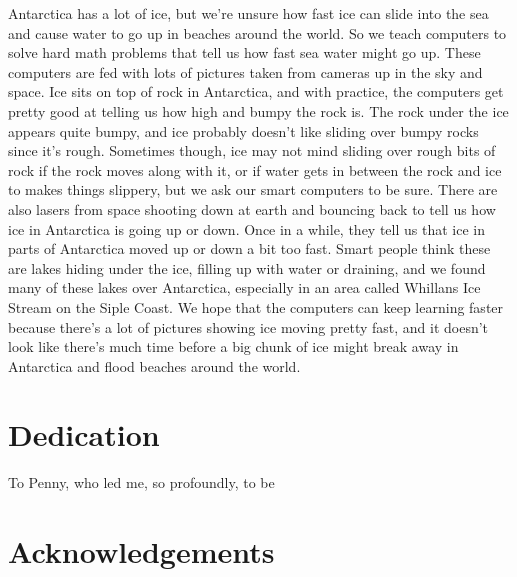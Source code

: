 \documentclass[12pt,twoside]{book}
\begin{document}
Antarctica has a lot of ice, but we're unsure how fast ice can slide into the sea and cause water to go up in beaches around the world.
So we teach computers to solve hard math problems that tell us how fast sea water might go up.
These computers are fed with lots of pictures taken from cameras up in the sky and space.
Ice sits on top of rock in Antarctica, and with practice, the computers get pretty good at telling us how high and bumpy the rock is.
The rock under the ice appears quite bumpy, and ice probably doesn't like sliding over bumpy rocks since it's rough.
Sometimes though, ice may not mind sliding over rough bits of rock if the rock moves along with it, or if water gets in between the rock and ice to makes things slippery, but we ask our smart computers to be sure.
There are also lasers from space shooting down at earth and bouncing back to tell us how ice in Antarctica is going up or down.
Once in a while, they tell us that ice in parts of Antarctica moved up or down a bit too fast.
Smart people think these are lakes hiding under the ice, filling up with water or draining, and we found many of these lakes over Antarctica, especially in an area called Whillans Ice Stream on the Siple Coast.
We hope that the computers can keep learning faster because there's a lot of pictures showing ice moving pretty fast, and it doesn't look like there's much time before a big chunk of ice might break away in Antarctica and flood beaches around the world.

\chapter*{Dedication}
To Penny, who led me, so profoundly, to be

\chapter*{Acknowledgements}
\end{document}
